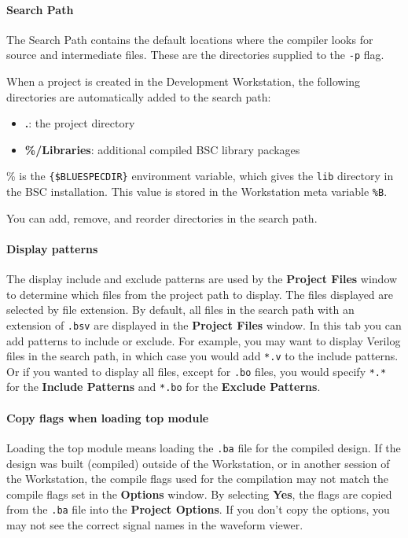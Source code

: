 \documentclass{article}
\newcommand{\te}[1]{\texttt{#1}}
\begin{document}
\label{options-searchpath}

\paragraph{Search Path}
The Search Path contains the default locations where the compiler
looks for source and intermediate files.  These are the directories
supplied to the \te{-p} flag.

When a project is created in the Development Workstation, the
following directories are automatically added to the search path:
\begin{itemize}
\item{\bf .}: the project directory
\item {\bf \%/Libraries}: additional compiled BSC library packages
\end{itemize}

 \% is the \te{\{\$BLUESPECDIR\}} environment
variable, which gives the \te{lib} directory in the BSC installation.  This
value is stored in the Workstation meta variable \te{\%B}.

You can add, remove, and reorder directories in the search path.


\paragraph{Display patterns}
The display include and exclude patterns are used by the {\bf Project
Files} window to determine which files from  the project path to display.
The files displayed  are selected by
file extension.   By default,
all files  in the search path with an
extension of \te{.bsv} are displayed in the {\bf Project Files}
window.  In this tab  you can add patterns to include or exclude.  For
example, you may want to display Verilog files in the search path, in
which case you would add \te{*.v} to the include patterns.   Or if you
wanted to display all files, except for \te{.bo} files,
you would specify \te{*.*} for the {\bf Include Patterns} and
 \te{*.bo} for the {\bf Exclude Patterns}.


\paragraph{Copy flags when loading top module}
Loading the top module means loading the \te{.ba} file for the
compiled design.  If the design was built (compiled) outside of the
Workstation, or in another session of the Workstation, the compile
flags used for the compilation may not match the compile flags set in
the {\bf Options} window.  By selecting {\bf Yes}, the flags are
copied from the \te{.ba} file into the {\bf Project Options}.  
If you don't copy the options, you may not see the correct signal names 
 in the waveform viewer.
\end{document}
